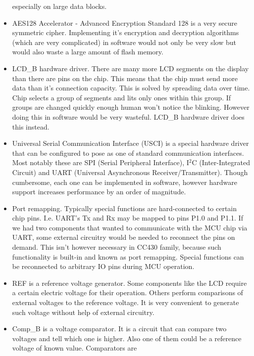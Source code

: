 \begin{itemize}
       especially on large data blocks.
 \item AES128 Accelerator - Advanced Encryption Standard 128 is a very
       secure symmetric cipher. Implementing it's encryption and
       decryption algorithms (which are very complicated) in software
       would not only be very slow but would also waste a large
       amount of flash memory.
 \item LCD\_B hardware driver. There are many more LCD segments on the
       display than there are pins on the chip. This means that the
       chip must send more data than it's connection capacity. This is
       solved by spreading data over time. Chip selects a group of
       segments and lits only ones within this group. If groups are
       changed quickly enough human won't notice the blinking. However
       doing this in software would be very wasteful. LCD\_B hardware
       driver does this instead.
 \item Universal Serial Communication Interface (USCI) is a special
       hardware driver that can be configured to pose as one of
       standard communication interfaces. Most notably these are SPI
       (Serial Peripheral Interface), I$^2$C (Inter-Integrated Circuit)
       and UART (Universal Asynchronous Receiver/Transmitter). Though
       cumbersome, each one can be implemented in software, however
       hardware support increases performance by an order of
       magnitude.
 \item Port remapping. Typically special functions are hard-connected to
       certain chip pins. I.e. UART's Tx and Rx may be mapped to pins
       P1.0 and P1.1. If we had two components that wanted to
       communicate with the MCU chip via UART, some external circuitry
       would be needed to reconnect the pins on demand. This isn't
       however necessary in CC430 family, because such functionality is
       built-in and known as port remapping. Special functions can
       be reconnected to arbitrary IO pins during MCU operation.
 \item REF is a reference voltage generator. Some components like the
     LCD require a certain electric voltage for their operation.
     Others perform comparisons of external voltages to the reference
     voltage. It is very convenient to generate such voltage without
     help of external circuitry.
 \item Comp\_B is a voltage comparator. It is a circuit that can
     compare two voltages and tell which one is higher. Also one of
     them could be a reference voltage of known value. Comparators are

\end{itemize}
